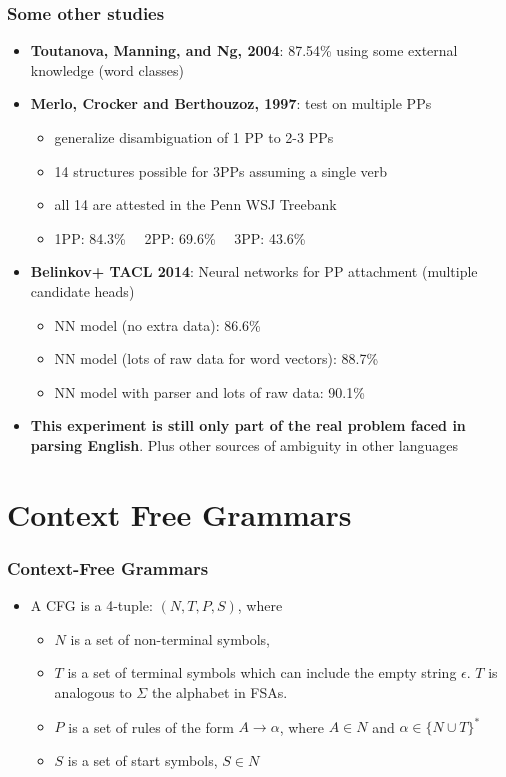 \begin{frame}
\frametitle{Some other studies}
  \begin{itemize}
  \item {\bf Toutanova, Manning, and Ng, 2004}: 87.54\% using some external knowledge (word classes)
  \item {\bf Merlo, Crocker and Berthouzoz, 1997}: test on multiple PPs
  \begin{itemize}
	\item generalize disambiguation of 1 PP to 2-3 PPs
	\item 14 structures possible for 3PPs assuming a single verb
	\item all 14 are attested in the Penn WSJ Treebank
	\item 1PP: 84.3\% \ \ 2PP: 69.6\% \ \ 3PP: 43.6\% 
  \end{itemize}
  \item {\bf Belinkov+ TACL 2014}: Neural networks for PP attachment (multiple candidate heads)
  \begin{itemize}
	\item NN model (no extra data): 86.6\%
	\item NN model (lots of raw data for word vectors): 88.7\%
	\item NN model with parser and lots of raw data: 90.1\%
  \end{itemize}
  \item {\bf This experiment is still only part of the real problem faced in parsing English}. Plus other sources of ambiguity in other languages
  \end{itemize}


\end{frame}

\section{Context Free Grammars}

\begin{frame}
\frametitle{Context-Free Grammars}
\begin{itemize}
\item A CFG is a 4-tuple: $(N, T, P, S)$, where 
\begin{itemize}
\item $N$ is a set of non-terminal symbols, 
\item $T$ is a set of terminal symbols which can include the empty
  string $\epsilon$. $T$ is analogous to $\Sigma$ the alphabet in FSAs.
\item $P$ is a set of rules of the form $A \rightarrow \alpha$, where $A \in N$ and $\alpha \in \{ N \cup T \}^\ast$
\item $S$ is a set of start symbols, $S \in N$
\end{itemize}
\end{itemize}

\end{frame}


